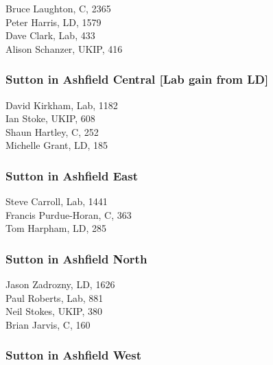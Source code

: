 \documentclass[a4paper,openany,10pt]{book}
\begin{document}
Bruce Laughton, C, 2365\\
Peter Harris, LD, 1579\\
Dave Clark, Lab, 433\\
Alison Schanzer, UKIP, 416\\


\subsubsection*{Sutton in Ashfield Central \hspace*{\fill}\nolinebreak[1]%
\enspace\hspace*{\fill}
[Lab gain from LD]}



David Kirkham, Lab, 1182\\
Ian Stoke, UKIP, 608\\
Shaun Hartley, C, 252\\
Michelle Grant, LD, 185\\


\subsubsection*{Sutton in Ashfield East}



Steve Carroll, Lab, 1441\\
Francis Purdue-Horan, C, 363\\
Tom Harpham, LD, 285\\


\subsubsection*{Sutton in Ashfield North}



Jason Zadrozny, LD, 1626\\
Paul Roberts, Lab, 881\\
Neil Stokes, UKIP, 380\\
Brian Jarvis, C, 160\\


\subsubsection*{Sutton in Ashfield West}
\end{document}
